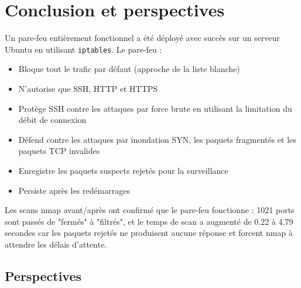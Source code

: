 \chapter{Conclusion et perspectives}
Un pare-feu entièrement fonctionnel a été déployé avec succès sur un serveur Ubuntu en utilisant \texttt{iptables}. Le pare-feu :
\begin{itemize}
    \item Bloque tout le trafic par défaut (approche de la liste blanche)
    \item N'autorise que SSH, HTTP et HTTPS
    \item Protège SSH contre les attaques par force brute en utilisant la limitation du débit de connexion
    \item Défend contre les attaques par inondation SYN, les paquets fragmentés et les paquets TCP invalides
    \item Enregistre les paquets suspects rejetés pour la surveillance
    \item Persiste après les redémarrages
\end{itemize}
Les scans nmap avant/après ont confirmé que le pare-feu fonctionne : 1021 ports sont passés de "fermés" à "filtrés", et le temps de scan a augmenté de 0.22 à 4.79 secondes car les paquets rejetés ne produisent aucune réponse et forcent nmap à attendre les délais d'attente.

\section{Perspectives}
\lipsum[11-12]
